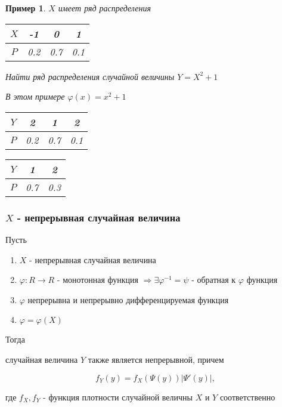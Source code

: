 \documentclass[a4paper, 14pt]{report}
\newtheorem{example}{Пример}[section]
\begin{document}
\begin{example}
    $X$ имеет ряд распределения

    \begin{table}[H]
        \centering
        \begin{tabular}{|c||c|c|c|}
            \hline
            $X$ & -1 & 0 & 1 \\
            \hline
            $P$ & 0.2 & 0.7 & 0.1 \\
            \hline
        \end{tabular}
    \end{table}

    Найти ряд распределения случайной величины $Y=X^2 + 1$

    В этом примере $\varphi(x) = x^2 + 1$

    \begin{table}[H]
        \centering
        \begin{tabular}{|c||c|c|c|}
            \hline
            $Y$ & 2 & 1 & 2 \\
            \hline
            $P$ & 0.2 & 0.7 & 0.1 \\
            \hline
        \end{tabular}
    \end{table}

    \begin{table}[H]
        \centering
        \begin{tabular}{|c||c|c|}
            \hline
            $Y$ & 1 & 2 \\
            \hline
            $P$ & 0.7 & 0.3 \\
            \hline
        \end{tabular}
    \end{table}
\end{example}

\subsubsection{$X$ - непрерывная случайная величина}

\begin{theorem}
    Пусть

    \begin{enumerate}
        \item $X$ - непрерывная случайная величина
        \item $\varphi: R \to R$ - монотонная функция $\Rightarrow \exists \varphi^{-1} = \psi$ - обратная к $\varphi$ функция
        \item $\varphi$ непрерывна и непрерывно дифференцируемая функция
        \item $\varphi = \varphi(X)$
    \end{enumerate}

    Тогда

    случайная величина $Y$ также является непрерывной, причем

    $$
    f_Y(y) = f_X(\Psi(y)) |\Psi'(y)|,
    $$

    где $f_X, f_Y$ - функция плотности случайной величны $X$ и $Y$ соответственно
\end{theorem}
\end{document}
